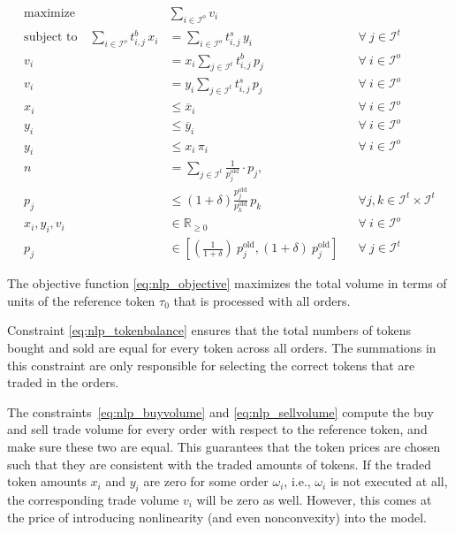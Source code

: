 \documentclass[11pt,parskip=full]{scrartcl}%
\newcommand*{\ie}{i.e., }
\newcommand*{\wrt}{with respect to }
\newcommand*{\itokens}{\mathcal{I}^t}       %
\newcommand*{\iorders}{\mathcal{I}^o}       %
\begin{document}
\begin{subequations}
\begin{align}
  \text{maximize} \quad & \sum\limits_{i \in \iorders} v_i
  \label{eq:nlp_objective}
  \\[2mm]
  \text{subject to} \quad
  \sum\limits_{i \in \iorders} t^b_{i,j} \, x_i
  &= \sum\limits_{i \in \iorders} t^s_{i,j} \, y_i
  && \forall \> j \in \itokens
  \label{eq:nlp_tokenbalance}
  \\[2mm]
  v_i
  &= x_i \sum\limits_{j \in \itokens} t^b_{i,j} \, p_j
  && \forall \> i \in \iorders
  \label{eq:nlp_buyvolume}
  \\[1mm]
  v_i
  &= y_i \sum\limits_{j \in \itokens} t^s_{i,j} \, p_j
  && \forall \> i \in \iorders
  \label{eq:nlp_sellvolume}
  \\[2mm]
  x_i &\le \overline{x}_i
  && \forall \> i \in \iorders
  \label{eq:nlp_limit_x}
  \\[1mm]
  y_i &\le \overline{y}_i
  && \forall \> i \in \iorders
  \label{eq:nlp_limit_y}
  \\[1mm]
  y_i &\le x_i \, \pi_i
  && \forall \> i \in \iorders
  \label{eq:nlp_limit_pi}
  \\[2mm]
  n
  &= \sum\limits_{j \in \itokens} \frac{1}{p^\mathrm{old}_j} \cdot p_j,
  \label{eq:nlp_reftoken}
  \\[1mm]
  p_j
  &\le \left(1+\delta\right) \frac{p^\mathrm{old}_j}{p^\mathrm{old}_k} \, p_k
  && \forall j,k \in \itokens \times \itokens
  \label{eq:nlp_maxfluct}
  \\[2mm]
  x_i, y_i, v_i &\in \mathbb{R}_{\ge 0}
  && \forall \> i \in \iorders
  \\[1mm]
  p_j
  &\in \left[ \left(\frac{1}{1+\delta}\right) \> p^\mathrm{old}_j, (1+\delta) \> p^\mathrm{old}_j
  \right]
  && \forall \> j \in \itokens
\end{align}
\label{eq:nlp}
\end{subequations}

The objective function \eqref{eq:nlp_objective} maximizes the total volume in terms of units of
the reference token $ \tau_0 $ that is processed with all orders.

Constraint \eqref{eq:nlp_tokenbalance} ensures that the total numbers of tokens bought and sold are
equal for every token across all orders.
The summations in this constraint are only responsible for selecting the correct tokens that are
traded in the orders.

The constraints~\eqref{eq:nlp_buyvolume} and \eqref{eq:nlp_sellvolume} compute the buy and sell
trade volume for every order \wrt the reference token, and make sure these two are equal.
This guarantees that the token prices are chosen such that they are consistent with the traded
amounts of tokens.
If the traded token amounts $ x_i $ and $ y_i $ are zero for some order $ \omega_i $, \ie
$ \omega_i $ is not executed at all, the corresponding trade volume $ v_i $ will be zero as well.
However, this comes at the price of introducing nonlinearity (and even nonconvexity) into the
model.
\end{document}
